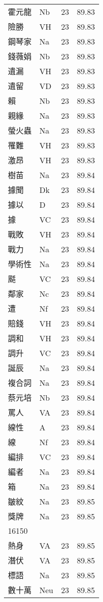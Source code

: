 \documentclass[twocolumn]{book}
\begin{document}
\begin{supertabular}{llrr}
霍元龍 & Nb & 23 &  89.83\\
險勝 & VH & 23 &  89.83\\
鋼琴家 & Na & 23 &  89.83\\
錢薇娟 & Nb & 23 &  89.83\\
遺漏 & VH & 23 &  89.83\\
遺留 & VD & 23 &  89.83\\
賴 & Nb & 23 &  89.83\\
親緣 & Na & 23 &  89.83\\
螢火蟲 & Na & 23 &  89.83\\
罹難 & VH & 23 &  89.83\\
激昂 & VH & 23 &  89.83\\
樹苗 & Na & 23 &  89.84\\
據聞 & Dk & 23 &  89.84\\
據以 & D & 23 &  89.84\\
據 & VC & 23 &  89.84\\
戰敗 & VH & 23 &  89.84\\
戰力 & Na & 23 &  89.84\\
學術性 & Na & 23 &  89.84\\
颳 & VC & 23 &  89.84\\
鄰家 & Nc & 23 &  89.84\\
遭 & Nf & 23 &  89.84\\
賠錢 & VH & 23 &  89.84\\
調和 & VH & 23 &  89.84\\
調升 & VC & 23 &  89.84\\
誕辰 & Na & 23 &  89.84\\
複合詞 & Na & 23 &  89.84\\
蔡元培 & Nb & 23 &  89.84\\
罵人 & VA & 23 &  89.84\\
線性 & A & 23 &  89.84\\
線 & Nf & 23 &  89.84\\
編排 & VC & 23 &  89.84\\
編者 & Na & 23 &  89.84\\
箱 & Na & 23 &  89.84\\
皺紋 & Na & 23 &  89.85\\
獎牌 & Na & 23 &  89.85\\
16150\\
熱身 & VA & 23 &  89.85\\
潛伏 & VA & 23 &  89.85\\
標語 & Na & 23 &  89.85\\
數十萬 & Neu & 23 &  89.85\\

\end{supertabular}
\end{document}
